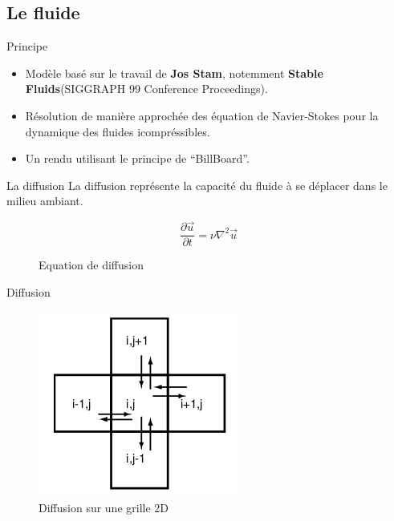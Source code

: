 \documentclass{beamer}
\begin{document}
\subsection{Le fluide}
\begin{frame}{Principe}
  \begin{itemize}
  \item Modèle basé sur le travail de \textbf{Jos Stam}, notemment
    \textbf{Stable Fluids}(SIGGRAPH 99 Conference Proceedings).
  \item Résolution de manière approchée des équation de Navier-Stokes
    pour la dynamique des fluides icompréssibles.
  \item Un rendu utilisant le principe de ``BillBoard''.    
  \end{itemize}
\end{frame}

\begin{frame}{La diffusion}
  La diffusion représente la capacité du fluide à se déplacer dans le
  milieu ambiant.
  \begin{figure}[h]
      \begin{equation}
        \frac{\partial \vec{u}}{\partial t} =  \nu{\nabla^2}\vec{u} 
      \end{equation}
      \caption{Equation de diffusion}
      \label{DiffusionEquation}
  \end{figure}
\end{frame}

\begin{frame}{Diffusion}
  \begin{figure}[h]
    \centering\includegraphics[scale=0.6]{STAM.png}
    \caption{Diffusion sur une grille 2D}
    \label{DiffusionStam}
  \end{figure}
\end{frame}
\end{document}
